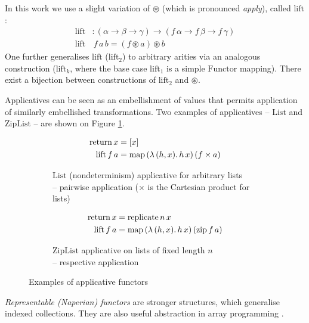 In this work we use a slight variation of $\circledast$ (which is pronounced \textit{apply}), called $\mathrm{lift}$:
\begin{align*}
\mathrm{lift}& : (\alpha \to \beta \to \gamma) \to (f\,\alpha \to f\,\beta \to f\,\gamma) \\ 
\mathrm{lift}&\,f\,a\,b = (f \circledast a) \circledast b
\end{align*}
One further generalises $\mathrm{lift}$ ($\mathrm{lift}_2$) to arbitrary arities via an analogous construction ($\mathrm{lift}_k$, where the base case $\mathrm{lift}_1$ is a simple $\mathrm{Functor}$ mapping). There exist a bijection between constructions of $\mathrm{lift}_2$ and $\circledast$.

Applicatives can be seen as an embellishment of values that permits application of similarly embellished transformations. Two examples of applicatives -- $\mathrm{List}$ and $\mathrm{ZipList}$ -- are shown on Figure \ref{fig:applicatives}.
%
\begin{figure}
\centering
\begin{subfigure}{.5\textwidth}
  \centering
  \begin{align*}
\mathrm{return}\,x &= [x] \\
\mathrm{lift}\,f\,a &= \mathrm{map}\,(\lambda\,(h, x) \ldotp h\,x)\,(f \times a)
  \end{align*}
  \caption{$\mathrm{List}$ (nondeterminism) applicative for arbitrary lists \\ -- pairwise application ($\times$ is the Cartesian product for lists)}
\end{subfigure}%
\begin{subfigure}{.5\textwidth}
  \centering
  \begin{align*}
\mathrm{return}\,x &= \mathrm{replicate}\,n\,x \\
\mathrm{lift}\,f\,a &= \mathrm{map}\,(\lambda\,(h, x) \ldotp h\,x)\,(\mathrm{zip}\,f\,a)
  \end{align*}
  \caption{$\mathrm{ZipList}$ applicative on lists of fixed length $n$ \\ -- respective application}
\end{subfigure}
\caption{Examples of applicative functors}
\label{fig:applicatives}
\end{figure}

\textit{Representable (Naperian) functors} are stronger structures, which generalise indexed collections. They are also useful abstraction in array programming \textcite{gibbons2016aplicative}.

